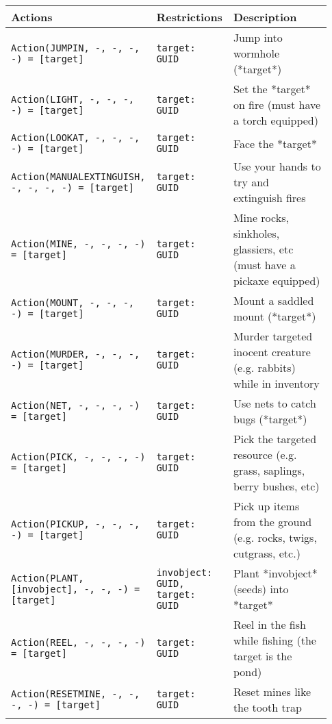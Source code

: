 \begin{table}[htb]
	\centering
    \caption{The second part of the available actions.}
    \label{tab:actions-2}
    {\footnotesize
    \begin{longtable}{ | p{0.35\linewidth} | p{0.18\linewidth} | p{0.4\linewidth} | }
        \hline 
        \textbf{Actions} & \textbf{Restrictions} & \textbf{Description} \\ \hline \hline
		\texttt{Action(JUMPIN, -, -, -, -) = [target]} & \texttt{{target: GUID}} & Jump into wormhole (*target*) \\ \hline 
		\texttt{Action(LIGHT, -, -, -, -) = [target]} & \texttt{{target: GUID}} & Set the *target* on fire (must have a torch equipped) \\ \hline 
		\texttt{Action(LOOKAT, -, -, -, -) = [target]} & \texttt{{target: GUID}} & Face the *target* \\ \hline 
		\texttt{Action(MANUALEXTINGUISH, -, -, -, -) = [target]} & \texttt{{target: GUID}} & Use your hands to try and extinguish fires \\ \hline 
		\texttt{Action(MINE, -, -, -, -) = [target]} & \texttt{{target: GUID}} & Mine rocks, sinkholes, glassiers, etc (must have a pickaxe equipped) \\ \hline 
		\texttt{Action(MOUNT, -, -, -, -) = [target]} & \texttt{{target: GUID}} & Mount a saddled mount (*target*) \\ \hline 
		\texttt{Action(MURDER, -, -, -, -) = [target]} & \texttt{{target: GUID}} & Murder targeted inocent creature (e.g. rabbits) while in inventory \\ \hline 
		\texttt{Action(NET, -, -, -, -) = [target]} & \texttt{{target: GUID}} & Use nets to catch bugs (*target*) \\ \hline 
		\texttt{Action(PICK, -, -, -, -) = [target]} & \texttt{{target: GUID}} & Pick the targeted resource (e.g. grass, saplings, berry bushes, etc) \\ \hline 
		\texttt{Action(PICKUP, -, -, -, -) = [target]} & \texttt{{target: GUID}} & Pick up items from the ground (e.g. rocks, twigs, cutgrass, etc.) \\ \hline 
		\texttt{Action(PLANT, [invobject], -, -, -) = [target]} & \texttt{{invobject: GUID, target: GUID}} & Plant *invobject* (seeds) into *target* \\ \hline 
		\texttt{Action(REEL, -, -, -, -) = [target]} & \texttt{{target: GUID}} & Reel in the fish while fishing (the target is the pond) \\ \hline 
		\texttt{Action(RESETMINE, -, -, -, -) = [target]} & \texttt{{target: GUID}} & Reset mines like the tooth trap \\ \hline 

\end{longtable}}
\end{table}
